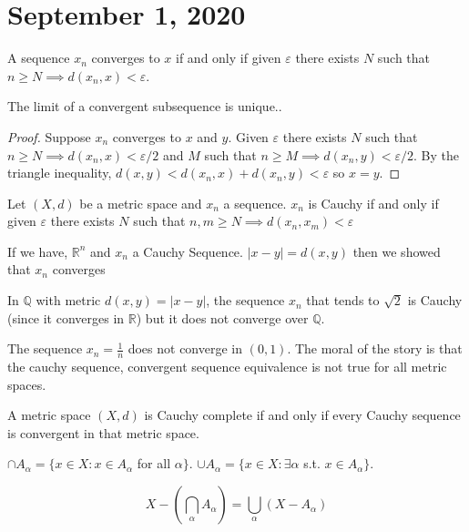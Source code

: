 \documentclass{article}
\newcommand{\Q}{\mathbb{Q}}
\newcommand{\R}{\mathbb{R}}
\newcommand{\eps}{\varepsilon}
\begin{document}
\section{September 1, 2020}
\begin{definition}
A sequence $x_n$ converges to $x$ if and only if given $\eps$ there exists $N$ such that $n\geq N\implies d(x_n,x)<\eps$.
\end{definition}
\begin{proposition}
The limit of a convergent subsequence is unique..
\end{proposition}
\begin{proof}
Suppose $x_n$ converges to $x$ and $y$. Given $\eps$ there exists $N$ such that $n\geq N\implies d(x_n,x)<\eps/2$ and $M$ such that $n\geq M\implies d(x_n,y)<\eps/2$. By the triangle inequality, $d(x,y)<d(x_n,x)+d(x_n,y)<\eps$ so $x=y$.
\end{proof}
\begin{definition}
Let $(X,d)$ be a metric space and $x_n$ a sequence. $x_n$ is Cauchy if and only if given $\eps$ there exists $N$ such that $n,m\geq N\implies d(x_n,x_m)<\eps$
\end{definition}
\begin{example}
If we have, $\R^n$ and $x_n$ a Cauchy Sequence. $|x-y|=d(x,y)$ then we showed that $x_n$ converges
\end{example}
\begin{example}
In $\Q$ with metric $d(x,y)=|x-y|$, the sequence $x_n$ that tends to $\sqrt{2}$ is Cauchy (since it converges in $\R$) but it does not converge over $\Q$.
\end{example}
\begin{example}
The sequence $x_n=\frac{1}{n}$ does not converge in $(0,1)$. The moral of the story is that the cauchy sequence, convergent sequence equivalence is not true for all metric spaces.
\end{example}
\begin{definition}
A metric space $(X,d)$ is Cauchy complete if and only if every Cauchy sequence is convergent in that metric space.
\end{definition}
\begin{example}
$\cap A_\alpha=\{x\in X:x\in A_\alpha$ for all $\alpha\}$. $\cup A_\alpha=\{x\in X:\exists \alpha$ s.t. $x\in A_\alpha\}$.
\end{example}
\begin{lemma}
$$X-(\bigcap_\alpha A_\alpha)=\bigcup_\alpha(X-A_\alpha)$$
\end{lemma}
\end{document}
